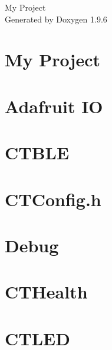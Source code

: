 \documentclass[twoside]{book}
\newcommand{\+}{\discretionary{\mbox{\scriptsize$\hookleftarrow$}}{}{}}
\newcommand{\clearemptydoublepage}{%
    \newpage{\pagestyle{empty}\cleardoublepage}%
  }
\begin{document}
  \raggedbottom
    \hypersetup{pageanchor=false,
                bookmarksnumbered=true,
                pdfencoding=unicode
               }
  \begin{titlepage}
  \vspace*{7cm}
  \begin{center}%
  {\Large My Project}\\
  \vspace*{1cm}
  {\large Generated by Doxygen 1.9.6}\\
  \end{center}
  \end{titlepage}
  \clearemptydoublepage
  \tableofcontents
  \clearemptydoublepage
  \hypersetup{pageanchor=true}
\chapter{My Project}
\label{index}\hypertarget{index}{}
\chapter{Adafruit IO}
\label{_adafruit_i_o}

\chapter{CTBLE}
\label{_c_t_b_l_e}

\chapter{CTConfig.\+h}
\label{_c_t_config_8h}

\chapter{Debug}
\label{debug}

\chapter{CTHealth}
\label{_c_t_health}

\chapter{CTLED}
\label{_c_t_l_e_d}

\end{document}
